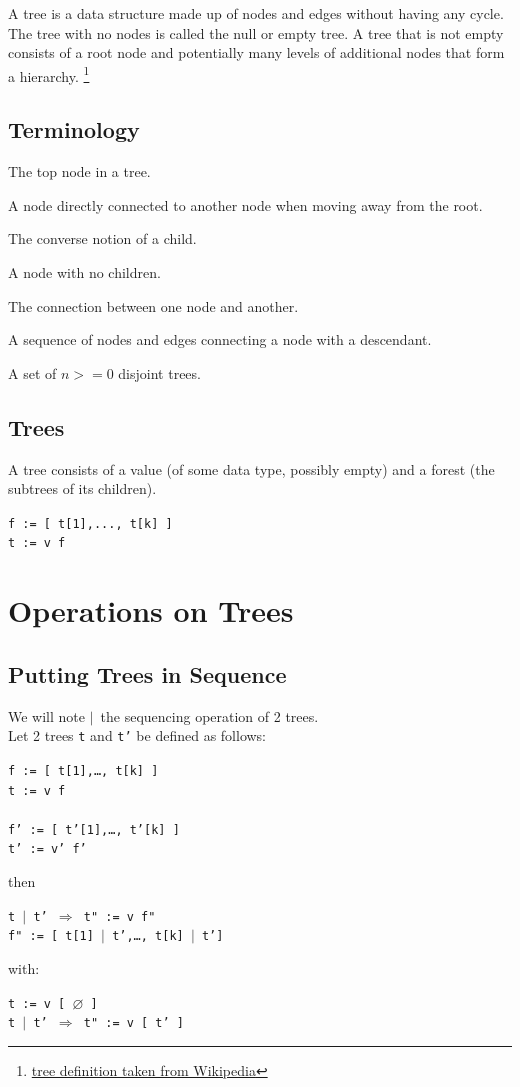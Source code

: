 \documentclass{article}
\newcommand{\code}	[2][0.9]		{\vspace{0mm}\begin{center}\colorbox{mygrey}{
							\begin{minipage}[t]{#1\columnwidth} 
							{\small \texttt{#2}}
							\end{minipage}}\end{center}}
\newcommand{\op}	[1]		{\vspace{0mm}\begin{center}\colorbox{mygrey}{
							\begin{minipage}[t]{0.9\columnwidth} 
							{\small \texttt{#1}}
							\end{minipage}}\end{center}}
\newcommand{\nulltree}	{\ensuremath{\varnothing}}
\newcommand{\seq}		{\ensuremath{|}}
\newcommand{\etc}		{…}
\begin{document}
A tree is a data structure made up of nodes and edges without having any cycle. The tree with no nodes is called the null or empty tree. A tree that is not empty consists of a root node and potentially many levels of additional nodes that form a hierarchy. \footnote{\href{https://en.wikipedia.org/wiki/Tree_(data_structure)}{tree definition taken from Wikipedia}}


\subsection{Terminology}

\begin{description}
 \setlength\itemsep{0.0em}
\item[Root]	The top node in a tree.
\item[Child]	A node directly connected to another node when moving away from the root.
\item[Parent]	The converse notion of a child.
\item[Leaf]	A node with no children.
\item[Edge]	The connection between one node and another.
\item[Path]	A sequence of nodes and edges connecting a node with a descendant.
\item[Forest]	A set of $n >= 0$ disjoint trees.
\end{description}

\subsection{Trees}
A tree consists of a value (of some data type, possibly empty) and a forest (the subtrees of its children).
\code{f := [ t[1],..., t[k] ] \\
t :=  v f
}


\section{Operations on Trees}

\subsection{Putting Trees in Sequence}
We will note \seq\ the sequencing operation of 2 trees. \\
Let 2 trees \texttt{t} and \texttt{t'} be defined as follows:
\op{f := [ t[1],\etc, t[k] ] \\
t :=  v f \\
\\
f' := [ t'[1],\etc, t'[k] ] \\
t' :=  v' f'
}
then
\op{t \seq\ t'  $\Rightarrow$  t" := v f" \\
f" := [ t[1] \seq\ t',\etc, t[k] \seq\ t']
}
with: 
\op{t :=  v [ \nulltree\ ]\\
t \seq\ t'  $\Rightarrow$  t" := v [ t' ]
}
\end{document}
